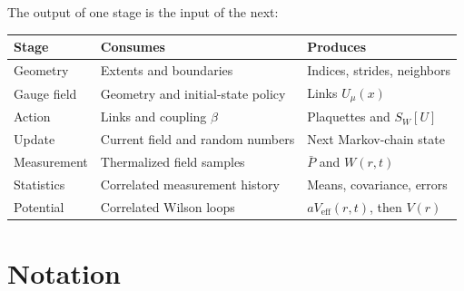 \documentclass[11pt]{article}
\begin{document}
The output of one stage is the input of the next:

\begin{center}
\begin{tabular}{@{}p{}p{}p{}@{}}
\toprule
\textbf{Stage} & \textbf{Consumes} & \textbf{Produces} \\
\midrule
Geometry & Extents and boundaries & Indices, strides, neighbors \\
Gauge field & Geometry and initial-state policy & Links \(U_\mu(x)\) \\
Action & Links and coupling \(\beta\) & Plaquettes and \(S_W[U]\) \\
Update & Current field and random numbers & Next Markov-chain state \\
Measurement & Thermalized field samples & \(\bar P\) and \(W(r,t)\) \\
Statistics & Correlated measurement history & Means, covariance, errors \\
Potential & Correlated Wilson loops & \(aV_{\mathrm{eff}}(r,t)\), then \(V(r)\) \\
\bottomrule
\end{tabular}
\end{center}

\section{Notation}
\end{document}
